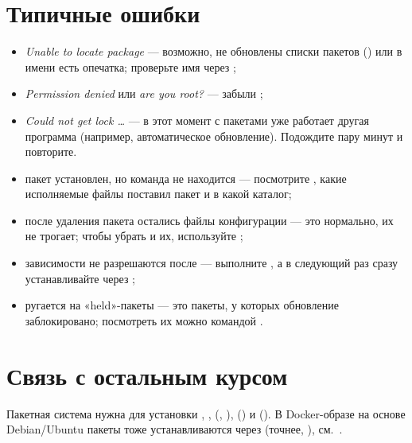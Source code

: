 \section{Типичные ошибки}
\begin{itemize}
  \item \emph{Unable to locate package} --- возможно, не обновлены
    списки пакетов () или в имени есть опечатка;
    проверьте имя через ;
  \item \emph{Permission denied} или \emph{are you root?} ---
    забыли ;
  \item \emph{Could not get lock \ldots} --- в этот момент с пакетами
    уже работает другая программа (например, автоматическое обновление).
    Подождите пару минут и повторите.
  \item пакет установлен, но команда не находится --- посмотрите
    , какие исполняемые файлы поставил пакет
    и в какой каталог;
  \item после удаления пакета остались файлы конфигурации --- это
    нормально,  их не трогает; чтобы убрать и их,
    используйте ;
  \item зависимости не разрешаются после  --- выполните
    , а в следующий раз сразу устанавливайте
     через ;
  \item {} ругается на «held»-пакеты --- это пакеты, у
    которых обновление заблокировано; посмотреть их можно
    командой .
\end{itemize}

\section{Связь с остальным курсом}

Пакетная система нужна для установки , ,
 (,
),  () и
 (). В Docker-образе на
основе Debian/Ubuntu пакеты тоже устанавливаются через 
(точнее, ), см.\ .


